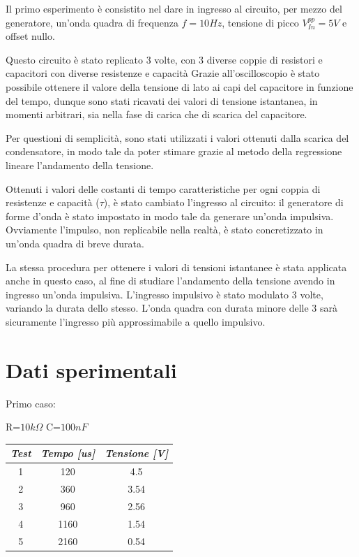     Il primo esperimento è consistito nel dare in ingresso al circuito, per mezzo del generatore,
    un'onda quadra di frequenza $f = 10Hz$, tensione di picco $V_{In}^{pp} = 5V$ e offset nullo.\par
    Questo circuito è stato replicato 3 volte, con 3 diverse coppie di resistori e capacitori con diverse
    resistenze e capacità
    Grazie all'oscilloscopio è stato possibile ottenere il valore della tensione di lato ai capi 
    del capacitore in funzione del tempo, dunque sono stati ricavati dei valori di tensione istantanea,
    in momenti arbitrari, sia nella fase di carica che di scarica del capacitore.  \par
    Per questioni di semplicità, sono stati utilizzati i valori ottenuti dalla scarica del condensatore, in modo tale
    da poter stimare grazie al metodo della regressione lineare l'andamento della tensione.\par
    Ottenuti i valori delle costanti di tempo caratteristiche per ogni coppia di resistenze e capacità ($\tau$),
    è stato cambiato l'ingresso al circuito: il generatore di forme d'onda è stato impostato in modo tale da generare
    un'onda impulsiva. Ovviamente l'impulso, non replicabile nella realtà, è stato concretizzato in un'onda quadra di breve
    durata. \par
    La stessa procedura per ottenere i valori di tensioni istantanee è stata applicata anche in questo caso,
    al fine di studiare l'andamento della tensione avendo in ingresso un'onda impulsiva.
    L'ingresso impulsivo è stato modulato 3 volte, variando la durata dello stesso.
    L'onda quadra con durata minore delle 3 sarà sicuramente l'ingresso più approssimabile a quello impulsivo. \par
    

    \section{Dati sperimentali}
    \begin{center}
        Primo caso: \par
        R=$10k\Omega$ C=$100nF$
    \end{center}
    \begin{center}
    \begin{tabular}{|c|c|c|}
        \hline
        \textit{Test} & \textit{Tempo [us]} & \textit{Tensione [V]} \\
        \hline
        1 & 120 & 4.5 \\
        \hline
        2 & 360 & 3.54 \\
        \hline
        3 & 960 & 2.56 \\
        \hline
        4 & 1160 & 1.54 \\
        \hline
        5 & 2160 & 0.54 \\
        \hline
    \end{tabular}
    \end{center}
    

